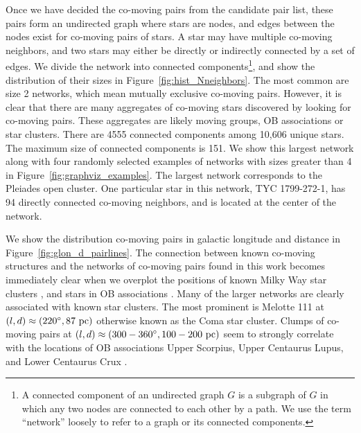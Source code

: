 \documentclass[manuscript, letterpaper]{aastex6}
\begin{document}
Once we have decided the co-moving pairs from the candidate pair list,
these pairs form an undirected graph where stars are nodes, and
edges between the nodes exist for co-moving pairs of stars.
A star may have multiple co-moving neighbors, and two stars may either
be directly or indirectly connected by a set of edges.
We divide the network into connected components\footnote{A connected component of an undirected graph $G$
is a subgraph of $G$ in which any two nodes are connected to each other by a path.
We use the term ``network'' loosely to refer to a graph or its connected components.},
and show the distribution of their sizes in Figure~\ref{fig:hist_Nneighbors}.
The most common are size 2 networks, which mean mutually exclusive co-moving
pairs. However, it is clear that there are many aggregates of co-moving stars
discovered by looking for co-moving pairs.
These aggregates are likely moving groups, OB associations or star clusters.
There are 4555 connected components among 10,606 unique stars.
The maximum size of connected components is 151.
We show this largest network along with four randomly selected
examples of networks with sizes greater than 4 in Figure~\ref{fig:graphviz_examples}.
The largest network corresponds to the Pleiades open cluster.
One particular star in this network, TYC 1799-272-1, has 94 directly connected
co-moving neighbors, and is located at the center of the network.

We show the distribution co-moving pairs in galactic longitude and
distance in Figure~\ref{fig:glon_d_pairlines}.
The connection between known co-moving structures and the networks of co-moving
pairs found in this work becomes immediately clear when
we overplot the positions of known Milky Way star clusters \citep{Kharchenko:2016aa},
and stars in OB associations \citep{de-Zeeuw:1999aa}.
Many of the larger networks are clearly associated with known star clusters.
The most prominent is Melotte 111 at
$(l,d)\approx (220\mbox{$^\circ$}, 87~\textrm{pc})$ otherwise known as the Coma star cluster.
Clumps of co-moving pairs at $(l,d)\approx (300-360\mbox{$^\circ$}, 100-200~\textrm{pc})$
seem to strongly correlate with the locations of OB associations
Upper Scorpius, Upper Centaurus Lupus, and Lower Centaurus Crux
\citep{de-Zeeuw:1999aa}.
\end{document}
